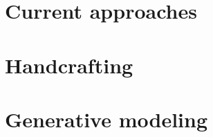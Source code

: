 
\lipsum[5]

\section{Current approaches}

\lipsum[5]

\section{Handcrafting}

\lipsum[5]

\section{Generative modeling}

\lipsum[5]

